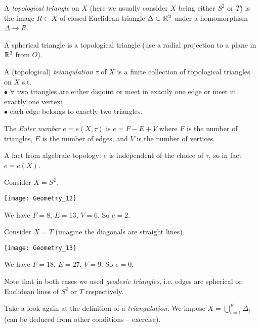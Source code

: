 \documentclass[a4paper]{article}
\begin{document}
\begin{defi}
A \emph{topological triangle} on $X$ (here we usually consider $X$ being either $S^2$ or $T$) is the image $R \subset X$ of closed Euclidean triangle $\Delta \subset \mathbb{R}^2$ under a homomorphism $\Delta \to R$.
\end{defi}

\begin{eg}
A spherical triangle is a topological triangle (use a radial projection to a plane in $\mathbb{R}^3$ from $O$).
\end{eg}

\begin{defi}
A (topological) \emph{triangulation} $\tau$ of $X$ is a finite collection of topological triangles on $X$ s.t.\\
$\bullet$ $\forall$ two triangles are either disjoint or meet in exactly one edge or meet in exactly one vertex;\\
$\bullet$ each edge belongs to exactly two triangles.
\end{defi}

\begin{defi}
The \emph{Euler number} $e=e(X,\tau)$ is $e=F-E+V$ where $F$ is the number of triangles, $E$ is the number of edges, and $V$ is the number of vertices.

A fact from algebraic topology: $e$ is independent of the choice of $\tau$, so in fact $e=e(X)$.
\end{defi}

\begin{eg}
Consider $X=S^2$.

\texttt{[image: Geometry\_12]}

We have $F=8$, $E=13$, $V=6$. So $e=2$.
\end{eg}

\begin{eg}
Consider $X=T$ (imagine the diagonals are straight lines).

\texttt{[image: Geometry\_13]}

We have $F=18$, $E=27$, $V=9$. So $e=0$.
\end{eg}

Note that in both cases we used \emph{geodesic triangles}, i.e. edges are spherical or Euclidean lines of $S^2$ or $T$ respectively.

\begin{rem} 
Take a look again at the definition of a \emph{triangulation}. We impose $X = \bigcup_{i=1}^F \Delta_i$ (can be deduced from other conditions -- exercise).
\end{rem}
\end{document}
